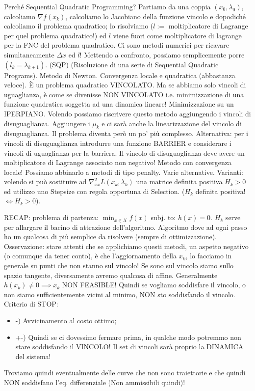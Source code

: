 Perché Sequential Quadratic Programming? Partiamo da una coppia $(x_0,\lambda_0)$, calcoliamo $\nabla{f(x_k)}$, calcoliamo lo Jacobiano della funzione vincolo e dopodiché calcoliamo il problema quadratico; lo risolviamo ($l :=$ moltiplicatore di Lagrange per quel problema quadratico!) ed $l$ viene fuori come moltiplicatore di lagrange per la FNC del problema quadratico. Ci sono metodi numerici per ricavare simultaneamente $\Delta x$ ed $l$! Mettendo a confronto, possiamo semplicemente porre $(l_k=\lambda_{k+1})$. (SQP) (Risoluzione di una serie di Sequential Quadratic Programs).
Metodo di Newton. Convergenza locale e quadratica (abbastanza veloce). \`E un problema quadratico VINCOLATO. Ma se abbiamo solo vincoli di uguaglianza, è come se divenisse NON VINCOLATO i.e. minimizzazione di una funzione quadratica soggetta ad una dinamica lineare! Minimizzazione su un IPERPIANO. Volendo possiamo riscrivere questo metodo aggiungendo i vincoli di disuguaglianza. Aggiungere i $\mu_k$ e ci sarà anche la linearizzazione del vincolo di disuguaglianza. Il problema diventa però un po' più complesso. Alternativa: per i vincoli di disuguaglianza introdurre una funzione BARRIER e considerare i vincoli di uguaglianza per la barriera. Il vincolo di disuguaglianza deve avere un moltiplicatore di Lagrange associato non negativo!
Metodo con convergenza locale! Possiamo abbinarlo a metodi di tipo penalty. Varie alternative. Varianti: volendo si può sostituire ad $\nabla_{xx}^2{L(x_k,\lambda_k)}$ una matrice definita positiva $H_k>0$ ed utilizzo uno Stepsize con regola opportuna di Selection. ($H_k$ definita positiva! $\iff H_k>0$).

RECAP: problema di partenza: $\min_{x\in X}{f(x)}$ subj. to: $h(x)=0$. $H_k$ serve per allargare il bacino di attrazione dell'algoritmo. Algoritmo dove ad ogni passo ho un qualcosa di più semplice da risolvere (sempre di ottimizzazione). Osservazione: stare attenti che se applichiamo questi metodi, un aspetto negativo (o comunque da tener conto), è che l'aggiornamento della $x_k$, lo facciamo in generale su punti che non stanno sul vincolo! Se sono sul vincolo siamo sullo spazio tangente, diversamente avremo qualcosa di affine. Generalmente $h(x_k)\neq 0 \implies x_k$ NON FEASIBLE! Quindi se vogliamo soddisfare il vincolo, o non siamo sufficientemente vicini al minimo, NON sto soddisfando il vincolo. Criterio di STOP:
\begin{itemize}
\item{-)} Avvicinamento al costo ottimo;
\item{+-)} Quindi se ci dovessimo fermare prima, in qualche modo potremmo non stare soddisfando il VINCOLO! Il set di vincoli sarà proprio la DINAMICA del sistema!
\end{itemize}
Troviamo quindi eventualmente delle curve che non sono traiettorie e che quindi NON soddisfano l'eq. differenziale (Non ammissibili quindi)!

